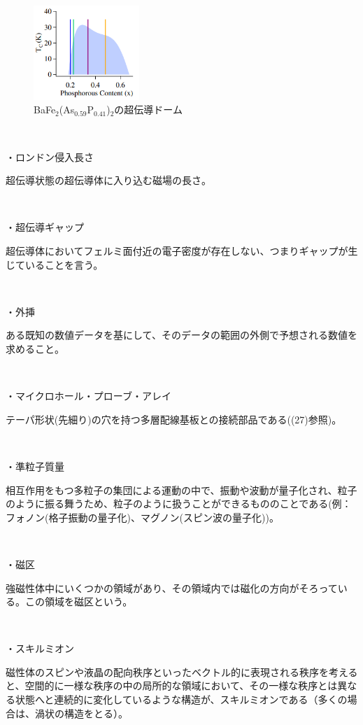 \documentclass[dvipdfmx]{jsarticle}
\begin{document}
\begin{figure}[h]
\centering
\includegraphics[width=4cm]{SCD.png}
\caption{BaFe$_2$(As$_{0.59}$P$_{0.41}$)$_2$の超伝導ドーム}
\end{figure}%

　　

・ロンドン侵入長さ

超伝導状態の超伝導体に入り込む磁場の長さ。

　　

・超伝導ギャップ

超伝導体においてフェルミ面付近の電子密度が存在しない、つまりギャップが生じていることを言う。

　　

・外挿

ある既知の数値データを基にして、そのデータの範囲の外側で予想される数値を求めること。

　　

・マイクロホール・プローブ・アレイ

テーパ形状(先細り)の穴を持つ多層配線基板との接続部品である((27)参照)。

　　

・準粒子質量

相互作用をもつ多粒子の集団による運動の中で、振動や波動が量子化され、粒子のように振る舞うため、粒子のように扱うことができるもののことである(例：フォノン(格子振動の量子化)、マグノン(スピン波の量子化))。

　　

・磁区

強磁性体中にいくつかの領域があり、その領域内では磁化の方向がそろっている。この領域を磁区という。

　　

・スキルミオン

磁性体のスピンや液晶の配向秩序といったベクトル的に表現される秩序を考えると、空間的に一様な秩序の中の局所的な領域において、その一様な秩序とは異なる状態へと連続的に変化しているような構造が、スキルミオンである（多くの場合は、渦状の構造をとる）。
\end{document}
